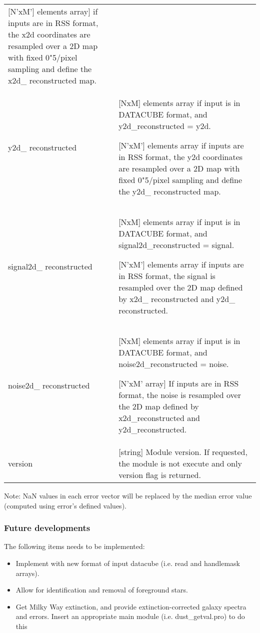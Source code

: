 \begin{center}
\begin{longtable}{p{2.7cm}| p{11.1cm}}
                          [N'xM'] elements array] if inputs are in RSS format, the x2d coordinates are resampled over a 2D map with fixed 0"5/pixel sampling
                                     and define the  x2d\_ reconstructed map.\\
%
 y2d\_ reconstructed &    [NxM] elements array   if input is in DATACUBE format,  and y2d\_reconstructed = y2d.

                          [N'xM'] elements array if inputs are in RSS format, the y2d coordinates are resampled over a 2D map with fixed 0"5/pixel sampling
                                     and define the  y2d\_ reconstructed map.\\
%
 signal2d\_ reconstructed  &  [NxM] elements array if input is in DATACUBE format, and  signal2d\_reconstructed = signal.

                         [N'xM'] elements array if inputs are in RSS format, the signal is resampled over the 2D map defined by
                                         x2d\_ reconstructed  and y2d\_ reconstructed. \\
%
 noise2d\_ reconstructed  &   [NxM] elements array if input is in DATACUBE format, and noise2d\_reconstructed = noise.

                        [N'xM' array] If inputs are in RSS format, the noise is resampled over the 2D map defined by
                                         x2d\_reconstructed  and y2d\_reconstructed. \\
%
 version   & [string]            Module version. If requested, the module is not execute and only version flag is returned.\\
%
\hline
\end{longtable}
\end{center}

Note: NaN values in each error vector will be replaced by the median
error value (computed using error's defined values).


\subsubsection{Future developments}

The following items needs to be implemented:

\begin{itemize}
  \item Implement with new format of input datacube (i.e. read and handlemask arrays).
  \item Allow for identification and removal of foreground stars.
  \item Get Milky Way extinction, and provide extinction-corrected galaxy spectra and errors. 
        Insert an appropriate main module (i.e. dust\_getval.pro) to do this
  
\end{itemize}
